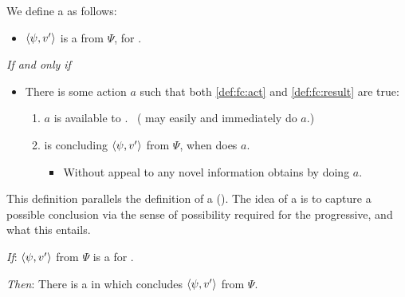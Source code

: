 \begin{note}[\fc{2} definition]
  We define a \emph{} as follows:

  \begin{definition}[\fc{3}]
    \label{def:fc}
    \begin{itemize}
    \item
      \(\langle \psi, v' \rangle\) is a \emph{} from \(\Psi\), for \vAgent{}.
    \end{itemize}

    \emph{If and only if}

    \begin{itemize}
    \item
      There is some action \(a\) such that both \ref{def:fc:act} and \ref{def:fc:result} are true:
      \begin{enumerate}[label=\alph*., ref=(\alph*), series=fcCounter]
      \item
        \label{def:fc:act}
        \(a\) is available to \vAgent{}.
        \mbox{ }\hfill (\vAgent{} may easily and immediately do \(a\).)
      \item
        \label{def:fc:result}
        \vAgent{} is concluding \(\langle \psi, v' \rangle\) from \(\Psi\), when \vAgent{} does \(a\).
        \begin{itemize}
        \item
          Without appeal to any novel information \vAgent{} obtains by doing \(a\).
        \end{itemize}
      \end{enumerate}
    \end{itemize}
    \vspace{-\baselineskip}
  \end{definition}

  This definition parallels the definition of a \pevent{} ().
  The idea of a \fc{} is to capture a possible conclusion via the sense of possibility required for the progressive, and what this entails.

  \begin{proposition}%
    \label{prop:fc:pevent}%
    \vspace{-\baselineskip}
    \begin{itenum}
    \item[\emph{If}:]
      \(\langle \psi, v' \rangle\) from \(\Psi\) is a \emph{} for \vAgent{}.
    \item[\emph{Then}:]
      There is a \pevent{} in which \vAgent{} concludes \(\langle \psi, v' \rangle\) from \(\Psi\).
    \end{itenum}
    \vspace{-\baselineskip}
  \end{proposition}


\end{note}
